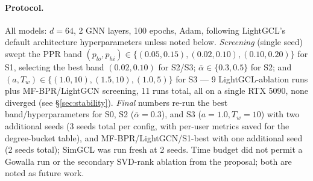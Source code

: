 \documentclass{article}
\begin{document}
\paragraph{Protocol.} All models: $d=64$, 2 GNN layers, 100 epochs, Adam, following
LightGCL's default architecture hyperparameters unless noted below. \emph{Screening}
(single seed) swept the PPR band $(p_{lo}, p_{hi}) \in \{(0.05,0.15), (0.02,0.10),
(0.10,0.20)\}$ for S1, selecting the best band $(0.02,0.10)$ for S2/S3; $\bar\alpha \in
\{0.3, 0.5\}$ for S2; and $(a, T_w) \in \{(1.0,10),(1.5,10),(1.0,5)\}$ for S3 --- 9
LightGCL-ablation runs plus MF-BPR/LightGCN screening, 11 runs total, all on a single
RTX 5090, none diverged (see \S\ref{sec:stability}). \emph{Final} numbers re-run the best
band/hyperparameters for S0, S2 ($\bar\alpha=0.3$), and S3 ($a=1.0, T_w=10$) with two
additional seeds (3 seeds total per config, with per-user metrics saved for the
degree-bucket table), and MF-BPR/LightGCN/S1-best with one additional seed (2 seeds
total); SimGCL was run fresh at 2 seeds. Time budget did not permit a Gowalla run or the
secondary SVD-rank ablation from the proposal; both are noted as future work.
\end{document}
